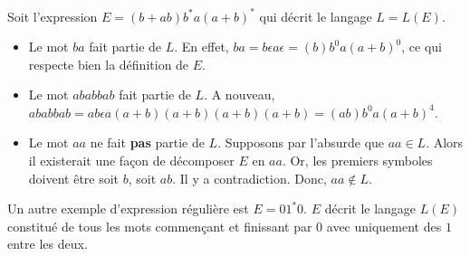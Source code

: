 \begin{example}
	Soit l'expression $E = (b+ab)b^*a(a+b)^*$ qui décrit le langage $L=L(E)$.\\
	\begin{itemize}
		\item Le mot $ba$ fait partie de $L$. En effet, $ba=b\epsilon a \epsilon=(b)b^0a(a+b)^0$, ce qui respecte bien la définition de $E$.
		\item Le mot $ababbab$ fait partie de $L$. A nouveau, $ababbab=ab\epsilon a (a+b)(a+b)(a+b)(a+b)=(ab)b^0a(a+b)^4$.
		\item Le mot $aa$ ne fait \textbf{pas} partie de $L$. Supposons par l'absurde que $aa \in L$. Alors il existerait une façon de décomposer $E$ en $aa$. Or, les premiers symboles doivent être soit $b$, soit $ab$. Il y a contradiction. Donc, $aa \notin L$.
	\end{itemize}
	\label{ex:regex}
\end{example}

Un autre exemple d'expression régulière est $E=01^*0$. $E$ décrit le langage $L(E)$ constitué de tous les mots commençant et finissant par $0$ avec uniquement des $1$ entre les deux.
